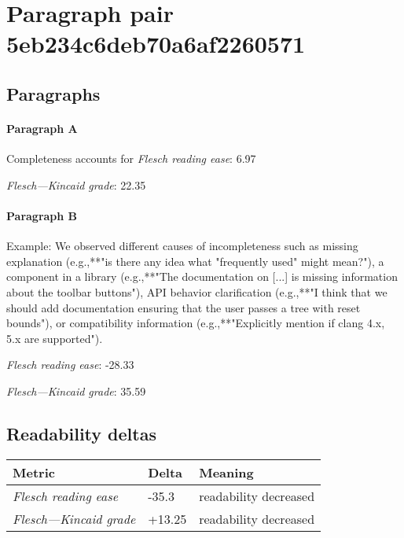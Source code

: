 \section{Paragraph pair 5eb234c6deb70a6af2260571}
\subsection{Paragraphs}
\paragraph{Paragraph A}
Completeness accounts for %
\emph{Flesch reading ease}: 6.97\par
\emph{Flesch---Kincaid grade}: 22.35

\paragraph{Paragraph B}
Example: We observed different causes of incompleteness such as missing explanation (e.g.,**"is there any idea what "frequently used" might mean?"), a component in a library (e.g.,**"The documentation on [...] is missing information about the toolbar buttons"), API behavior clarification (e.g.,**"I think that we should add documentation ensuring that the user passes a tree with reset bounds"), or compatibility information (e.g.,**"Explicitly mention if clang 4.x, 5.x are supported").\par\medskip
\emph{Flesch reading ease}: -28.33\par
\emph{Flesch---Kincaid grade}: 35.59

\subsection{Readability deltas}

\begin{tabular}{lll}
\toprule
               \textbf{Metric} & \textbf{Delta} &       \textbf{Meaning} \\
\midrule
    \emph{Flesch reading ease} &          -35.3 &  readability decreased \\
 \emph{Flesch---Kincaid grade} &         +13.25 &  readability decreased \\
\bottomrule
\end{tabular}

